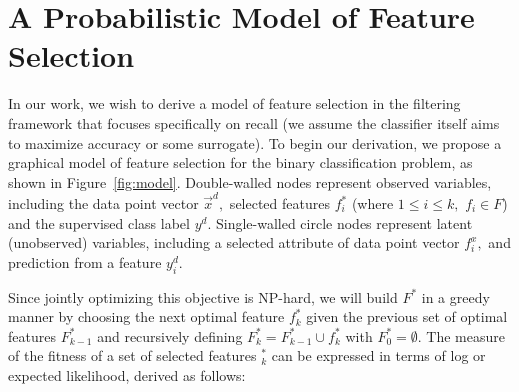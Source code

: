 \section{A Probabilistic Model of Feature Selection}

%


In our work, we wish to derive a model of feature selection in the
filtering framework that focuses specifically on recall (we assume the
classifier itself aims to maximize accuracy or some surrogate).  To
begin our derivation, we propose a graphical model of feature
selection for the binary classification problem, as shown in
Figure~\ref{fig:model}. Double-walled nodes represent observed
variables, including the data point vector $\vec{x}^{d},$ selected
features $f_i^*$ (where $1\leq i\leq k,$ $f_i\in F$) and the
supervised class label $y^d.$ Single-walled circle nodes represent
latent (unobserved) variables, including a selected attribute of data
point vector $f_i^x,$ and prediction from a feature $y^d_i.$

Since jointly optimizing this objective is NP-hard, we will build
$F^*$ in a greedy manner by choosing the next optimal feature $f^*_k$
given the previous set of optimal features $F^*_{k-1}$ and recursively
defining $F^*_k = F^*_{k-1}\cup f^*_k$ with $F^*_0 = \emptyset$. The
measure of the fitness of a set of selected features $^*_k$ can be
expressed in terms of log or expected likelihood, derived as follows:

